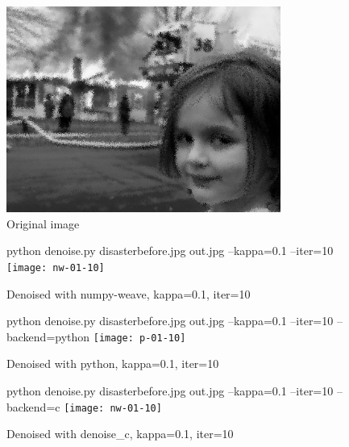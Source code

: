 \begin{figure}[!h]
\centering
\includegraphics[width=90mm]{disasterbefore}
\caption{Original image \label{original}}
\end{figure}

\pagebreak

\begin{figure}[!h]
\centering
python denoise.py disasterbefore.jpg out.jpg --kappa=0.1 --iter=10
\texttt{[image: nw-01-10]}
\caption{Denoised with numpy-weave, kappa=0.1, iter=10 \label{nw-mono}}
\end{figure}

\pagebreak

\begin{figure}[!h]
\centering
python denoise.py disasterbefore.jpg out.jpg --kappa=0.1 --iter=10 --backend=python
\texttt{[image: p-01-10]}
\caption{Denoised with python, kappa=0.1, iter=10 \label{p-mono}}
\end{figure}

\pagebreak

\begin{figure}[!h]
\centering
python denoise.py disasterbefore.jpg out.jpg --kappa=0.1 --iter=10 --backend=c
\texttt{[image: nw-01-10]}
\caption{Denoised with denoise\_c, kappa=0.1, iter=10 \label{c-mono}}
\end{figure}

\pagebreak